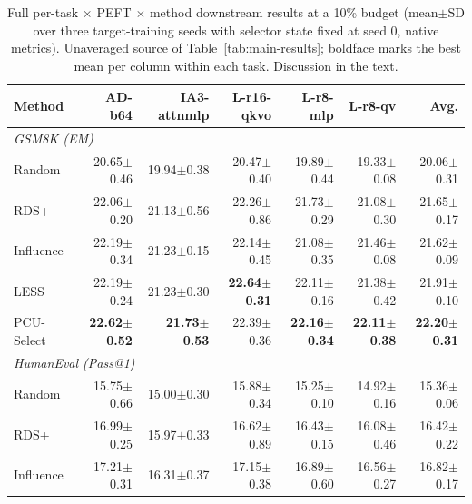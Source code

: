\begin{table}[t]
\centering
\small
\setlength{\tabcolsep}{4pt}
\caption{Full per-task $\times$ PEFT $\times$ method downstream results at a 10\% budget (mean$\pm$SD over three target-training seeds with selector state fixed at seed 0, native metrics). Unaveraged source of Table~\ref{tab:main-results}; boldface marks the best mean per column within each task. Discussion in the text.}
\label{tab:per-task-peft}
\begin{tabular}{lrrrrrr}
\toprule
Method & AD-b64 & IA3-attnmlp & L-r16-qkvo & L-r8-mlp & L-r8-qv & Avg. \\
\midrule
\multicolumn{7}{l}{\textit{GSM8K (EM)}} \\
Random & 20.65{\scriptsize$\pm$0.46} & 19.94{\scriptsize$\pm$0.38} & 20.47{\scriptsize$\pm$0.40} & 19.89{\scriptsize$\pm$0.44} & 19.33{\scriptsize$\pm$0.08} & 20.06{\scriptsize$\pm$0.31} \\
RDS+ & 22.06{\scriptsize$\pm$0.20} & 21.13{\scriptsize$\pm$0.56} & 22.26{\scriptsize$\pm$0.86} & 21.73{\scriptsize$\pm$0.29} & 21.08{\scriptsize$\pm$0.30} & 21.65{\scriptsize$\pm$0.17} \\
Influence & 22.19{\scriptsize$\pm$0.34} & 21.23{\scriptsize$\pm$0.15} & 22.14{\scriptsize$\pm$0.45} & 21.08{\scriptsize$\pm$0.35} & 21.46{\scriptsize$\pm$0.08} & 21.62{\scriptsize$\pm$0.09} \\
LESS & 22.19{\scriptsize$\pm$0.24} & 21.23{\scriptsize$\pm$0.30} & \textbf{22.64{\scriptsize$\pm$0.31}} & 22.11{\scriptsize$\pm$0.16} & 21.38{\scriptsize$\pm$0.42} & 21.91{\scriptsize$\pm$0.10} \\
PCU-Select & \textbf{22.62{\scriptsize$\pm$0.52}} & \textbf{21.73{\scriptsize$\pm$0.53}} & 22.39{\scriptsize$\pm$0.36} & \textbf{22.16{\scriptsize$\pm$0.34}} & \textbf{22.11{\scriptsize$\pm$0.38}} & \textbf{22.20{\scriptsize$\pm$0.31}} \\
\midrule
\multicolumn{7}{l}{\textit{HumanEval (Pass@1)}} \\
Random & 15.75{\scriptsize$\pm$0.66} & 15.00{\scriptsize$\pm$0.30} & 15.88{\scriptsize$\pm$0.34} & 15.25{\scriptsize$\pm$0.10} & 14.92{\scriptsize$\pm$0.16} & 15.36{\scriptsize$\pm$0.06} \\
RDS+ & 16.99{\scriptsize$\pm$0.25} & 15.97{\scriptsize$\pm$0.33} & 16.62{\scriptsize$\pm$0.89} & 16.43{\scriptsize$\pm$0.15} & 16.08{\scriptsize$\pm$0.46} & 16.42{\scriptsize$\pm$0.22} \\
Influence & 17.21{\scriptsize$\pm$0.31} & 16.31{\scriptsize$\pm$0.37} & 17.15{\scriptsize$\pm$0.38} & 16.89{\scriptsize$\pm$0.60} & 16.56{\scriptsize$\pm$0.27} & 16.82{\scriptsize$\pm$0.17} \\

\end{tabular}
\end{table}
